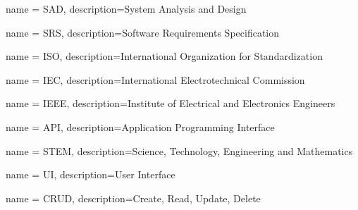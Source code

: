 

{
    name = SAD,
    description={System Analysis and Design}
}

{
    name = SRS,
    description={Software Requirements Specification}
}

{
    name = ISO,
    description={International Organization for Standardization}
}

{
    name = IEC,
    description={International Electrotechnical Commission}
}

{
    name = IEEE,
    description={Institute of Electrical and Electronics Engineers}
}

{
    name = API,
    description={Application Programming Interface}
}

{
    name = STEM,
    description={Science, Technology, Engineering and Mathematics}
}

{
    name = UI,
    description={User Interface}
}

{
    name = CRUD,
    description={Create, Read, Update, Delete}
}

